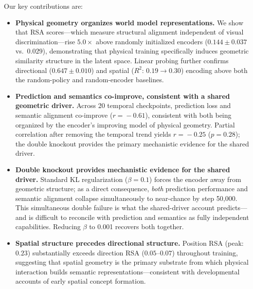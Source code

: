 \documentclass{article}
\begin{document}
Our key contributions are:
\begin{itemize}
  \item \textbf{Physical geometry organizes world model representations.}
        We show that RSA scores---which measure structural alignment
        independent of visual discrimination---rise $5.0\times$ above
        randomly initialized encoders ($0.144\!\pm\!0.037$ vs.\ $0.029$),
        demonstrating that physical training specifically induces
        geometric similarity structure in the latent space.
        Linear probing further confirms directional ($0.647\!\pm\!0.010$)
        and spatial ($R^2$: $0.19\!\to\!0.30$) encoding above both
        the random-policy and random-encoder baselines.

  \item \textbf{Prediction and semantics co-improve, consistent with a shared geometric driver.}
        Across 20 temporal checkpoints, prediction loss and semantic alignment
        co-improve ($r\!=\!-0.61$), consistent with both being organized by
        the encoder's improving model of physical geometry.
        Partial correlation after removing the temporal trend yields
        $r\!=\!-0.25$ ($p\!=\!0.28$); the double knockout provides the
        primary mechanistic evidence for the shared driver.

  \item \textbf{Double knockout provides mechanistic evidence for the shared driver.}
        Standard KL regularization ($\beta\!=\!0.1$) forces the encoder
        away from geometric structure; as a direct consequence,
        \emph{both} prediction performance and semantic alignment collapse
        simultaneously to near-chance by step 50{,}000.
        This simultaneous double failure is what the shared-driver
        account predicts---and is difficult to reconcile with
        prediction and semantics as fully independent capabilities.
        Reducing $\beta$ to 0.001 recovers both together.

  \item \textbf{Spatial structure precedes directional structure.}
        Position RSA (peak: $0.23$) substantially exceeds direction RSA
        ($0.05$--$0.07$) throughout training, suggesting that spatial
        geometry is the primary substrate from which physical interaction
        builds semantic representations---consistent with developmental
        accounts of early spatial concept formation.
\end{itemize}

\end{document}
